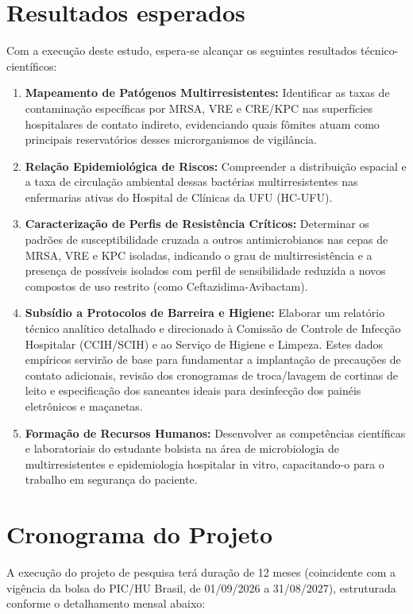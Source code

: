 \documentclass[12pt,a4paper]{article}
\begin{document}
\section{Resultados esperados}
Com a execução deste estudo, espera-se alcançar os seguintes resultados técnico-científicos:
\begin{enumerate}
    \item \textbf{Mapeamento de Patógenos Multirresistentes:} Identificar as taxas de contaminação específicas por MRSA, VRE e CRE/KPC nas superfícies hospitalares de contato indireto, evidenciando quais fômites atuam como principais reservatórios desses microrganismos de vigilância.
    \item \textbf{Relação Epidemiológica de Riscos:} Compreender a distribuição espacial e a taxa de circulação ambiental dessas bactérias multirresistentes nas enfermarias ativas do Hospital de Clínicas da UFU (HC-UFU).
    \item \textbf{Caracterização de Perfis de Resistência Críticos:} Determinar os padrões de susceptibilidade cruzada a outros antimicrobianos nas cepas de MRSA, VRE e KPC isoladas, indicando o grau de multirresistência e a presença de possíveis isolados com perfil de sensibilidade reduzida a novos compostos de uso restrito (como Ceftazidima-Avibactam).
    \item \textbf{Subsídio a Protocolos de Barreira e Higiene:} Elaborar um relatório técnico analítico detalhado e direcionado à Comissão de Controle de Infecção Hospitalar (CCIH/SCIH) e ao Serviço de Higiene e Limpeza. Estes dados empíricos servirão de base para fundamentar a implantação de precauções de contato adicionais, revisão dos cronogramas de troca/lavagem de cortinas de leito e especificação dos saneantes ideais para desinfecção dos painéis eletrônicos e maçanetas.
    \item \textbf{Formação de Recursos Humanos:} Desenvolver as competências científicas e laboratoriais do estudante bolsista na área de microbiologia de multirresistentes e epidemiologia hospitalar in vitro, capacitando-o para o trabalho em segurança do paciente.
\end{enumerate}
\newpage

\section{Cronograma do Projeto}
A execução do projeto de pesquisa terá duração de 12 meses (coincidente com a vigência da bolsa do PIC/HU Brasil, de 01/09/2026 a 31/08/2027), estruturada conforme o detalhamento mensal abaixo:
\end{document}

